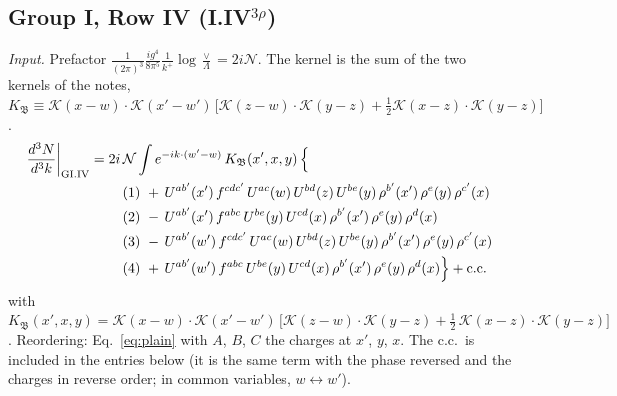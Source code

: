 \documentclass[10pt]{article}
\numberwithin{equation}{section}
\newcommand{\KK}{\mathcal K}
\newcommand{\NN}{\mathcal N}
\begin{document}
\subsection{Group I, Row IV \texorpdfstring{(I.IV$^{3\rho}$)}{}}\label{src:3:I.IV}
\emph{Input.} Prefactor $\frac{1}{(2\pi)^3}\frac{ig^4}{8\pi^5}\frac1{k^+}\log\frac\vee\Lambda=2i\NN$. The kernel is the sum of the two kernels of the notes, $K_{\mathfrak B}\equiv\KK(x-w)\cdot\KK(x'-w')\,\big[\KK(z-w)\cdot\KK(y-z)+\tfrac12\KK(x-z)\cdot\KK(y-z)\big]$.
\begin{align}
\frac{d^3N}{d^3k}\bigg|_{\rm GI.IV}={}&2i\,\NN\int e^{-ik\cdot(w'-w)}\,K_{\mathfrak B}(x',x,y)\,\Big\{\notag\\
&\quad (1)\ +\,U^{ab'}(x')\,f^{cdc'}\,U^{ac}(w)\,U^{bd}(z)\,U^{be}(y)\,\rho^{b'}(x')\,\rho^{e}(y)\,\rho^{c'}(x)\notag\\
&\quad (2)\ -\,U^{ab'}(x')\,f^{abc}\,U^{be}(y)\,U^{cd}(x)\,\rho^{b'}(x')\,\rho^{e}(y)\,\rho^{d}(x)\notag\\
&\quad (3)\ -\,U^{ab'}(w')\,f^{cdc'}\,U^{ac}(w)\,U^{bd}(z)\,U^{be}(y)\,\rho^{b'}(x')\,\rho^{e}(y)\,\rho^{c'}(x)\notag\\
&\quad (4)\ +\,U^{ab'}(w')\,f^{abc}\,U^{be}(y)\,U^{cd}(x)\,\rho^{b'}(x')\,\rho^{e}(y)\,\rho^{d}(x)\Big\}+{\rm c.c.}\label{eq:in-GI.IV}
\end{align}
with $K_{\mathfrak B}(x',x,y)=\KK(x-w)\cdot\KK(x'-w')\,\Big[\KK(z-w)\cdot\KK(y-z)+\tfrac12\,\KK(x-z)\cdot\KK(y-z)\Big]$.
Reordering: Eq.~\eqref{eq:plain} with $A$, $B$, $C$ the charges at $x'$, $y$, $x$.
The c.c.\ is included in the entries below (it is the same term with the phase reversed and the charges in reverse order; in common variables, $w\leftrightarrow w'$).
\end{document}
